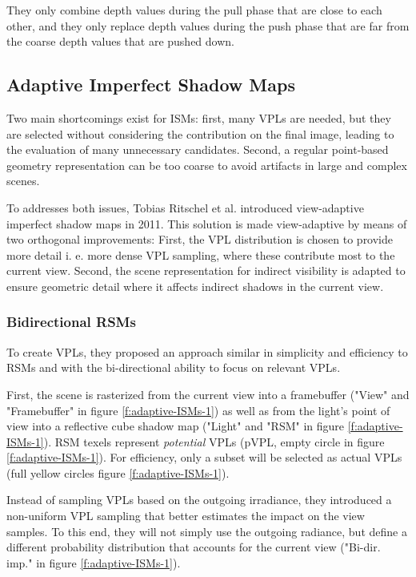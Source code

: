 They only combine depth values during the pull phase that are close to each other, and they only replace depth values during the push phase that are far from the coarse depth values that are pushed down.


\subsection{Adaptive Imperfect Shadow Maps}
Two main shortcomings exist for ISMs: first, many VPLs are needed, but they are selected without considering the contribution on the final image, leading to the evaluation of many unnecessary candidates. Second, a regular point-based geometry representation can be too coarse to avoid artifacts in large and complex scenes. 

To addresses both issues, Tobias Ritschel et al. introduced view-adaptive imperfect shadow maps\cite{a:MakingImperfectShadowMapsViewAdaptive:HighQualityGlobalIlluminationinLargeDynamicScenes} in 2011. This solution is made view-adaptive by means of two orthogonal improvements: First, the VPL distribution is chosen to provide more detail i. e. more dense VPL sampling, where these contribute most to the current view. Second, the scene representation for indirect visibility is adapted to ensure geometric detail where it affects indirect shadows in the current view.



\subsubsection{Bidirectional RSMs}
To create VPLs, they proposed an approach similar in simplicity and efficiency to RSMs and with the bi-directional ability to focus on relevant VPLs\cite{a:BidirectionalInstantRadiosity}.

First, the scene is rasterized from the current view into a framebuffer ("View" and "Framebuffer" in figure \ref{f:adaptive-ISMs-1}) as well as from the light's point of view into a reflective cube shadow map ("Light" and "RSM" in figure \ref{f:adaptive-ISMs-1}). RSM texels represent \textit{potential} VPLs (pVPL, empty circle in figure \ref{f:adaptive-ISMs-1}). For efficiency, only a subset will be selected as actual VPLs (full yellow circles figure \ref{f:adaptive-ISMs-1}). 

Instead of sampling VPLs based on the outgoing irradiance, they introduced a non-uniform VPL sampling that better estimates the impact on the view samples. To this end, they will not simply use the outgoing radiance, but define a different probability distribution that accounts for the current view ("Bi-dir. imp." in figure \ref{f:adaptive-ISMs-1}).

